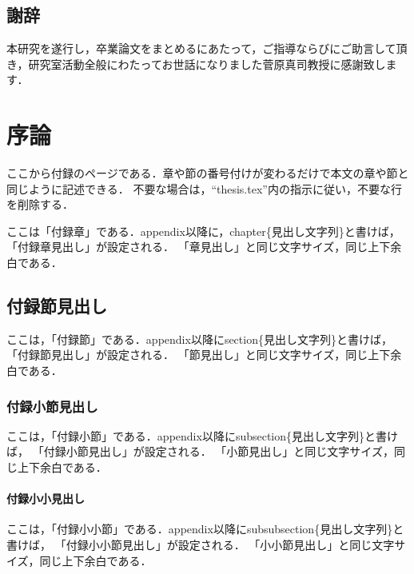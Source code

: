 \documentclass[11pt]{icsthesis}
\begin{document}
\clearpage
\fancyhead[L]{}\fancyhead[R]{}
\renewcommand{\headrulewidth}{0truemm}
\section*{謝辞}
本研究を遂行し，卒業論文をまとめるにあたって，ご指導ならびにご助言して頂き，研究室活動全般にわたってお世話になりました菅原真司教授に感謝致します．

\clearpage

\fancyhead[L]{\nouppercase{\small\leftmark}}\fancyhead[R]{}
\renewcommand{\headrulewidth}{0.3truemm}


\clearpage
\fancyhead[L]{\nouppercase{\small\leftmark}}
\fancyhead[R]{\nouppercase{\small\rightmark}}
\fancyfoot[C]{--\ \thepage\ --}
\renewcommand{\headrulewidth}{0.3truemm}
\appendix
\chapter{序論}
ここから付録のページである．章や節の番号付けが変わるだけで本文の章や節と同じように記述できる．
不要な場合は，``\textsf{thesis.tex}''内の指示に従い，不要な行を削除する．

ここは「付録章」である．\textsf{\yen appendix}以降に，\textsf{\yen chapter\{見出し文字列\}}と書けば，
「付録章見出し」が設定される．
「章見出し」と同じ文字サイズ，同じ上下余白である．

\section{付録節見出し}
ここは，「付録節」である．\textsf{\yen appendix}以降に\textsf{\yen section\{見出し文字列\}}と書けば，
「付録節見出し」が設定される．
「節見出し」と同じ文字サイズ，同じ上下余白である．

\subsection{付録小節見出し}
ここは，「付録小節」である．\textsf{\yen appendix}以降に\textsf{\yen subsection\{見出し文字列\}}と書けば，
「付録小節見出し」が設定される．
「小節見出し」と同じ文字サイズ，同じ上下余白である．

\subsubsection{付録小小見出し}
ここは，「付録小小節」である．\textsf{\yen appendix}以降に\textsf{\yen subsubsection\{見出し文字列\}}と書けば，
「付録小小節見出し」が設定される．
「小小節見出し」と同じ文字サイズ，同じ上下余白である．
\end{document}
